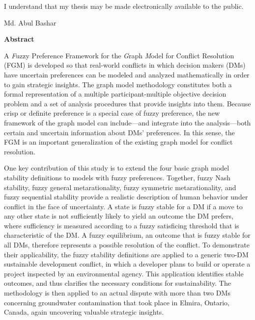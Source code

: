 \bigskip

\noindent
I understand that my thesis may be made electronically available to the public.

\hspace{7mm}

\noindent Md. Abul Bashar

\cleardoublepage




\begin{center}
  \textbf{\LARGE{Abstract}}
\end{center}

A \emph{F}uzzy Preference Framework for the \emph{G}raph \emph{M}odel for Conflict Resolution (FGM) is developed so that real-world conflicts in which decision makers (DMs) have uncertain preferences can be modeled and analyzed mathematically in order to gain strategic insights. The graph model methodology constitutes both a formal representation of a multiple participant-multiple objective decision problem and a set of analysis procedures that provide insights into them. Because crisp or definite preference is a special case of fuzzy preference, the new framework of the graph model can include---and integrate into the analysis---both certain and uncertain information about DMs' preferences. In this sense, the FGM is an important generalization of the existing graph model for conflict resolution.

One key contribution of this study is to extend the four basic graph model stability definitions to models with fuzzy preferences. Together, fuzzy Nash stability, fuzzy general metarationality, fuzzy symmetric metarationality, and fuzzy sequential stability provide a realistic description of human behavior under conflict in the face of uncertainty. A state is fuzzy stable for a DM if a move to any other state is not sufficiently likely to yield an outcome the DM prefers, where sufficiency is measured according to a fuzzy satisficing threshold that is characteristic of the DM. A fuzzy equilibrium, an outcome that is fuzzy stable for all DMs, therefore represents a possible resolution of the conflict. To demonstrate their applicability, the fuzzy stability definitions are applied to a generic two-DM sustainable development conflict, in which a developer plans to build or operate a project inspected by an environmental agency. This application identifies stable outcomes, and thus clarifies the necessary conditions for sustainability. The methodology is then applied to an actual dispute with more than two DMs concerning groundwater contamination that took place in Elmira, Ontario, Canada, again uncovering valuable strategic insights.

